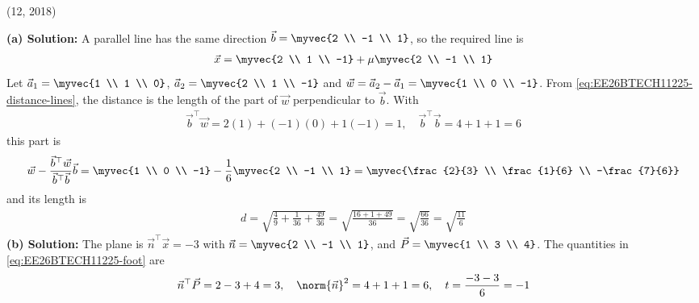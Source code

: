 \begin{enumerate}[label=\thesubsection.\arabic*, ref=\thesubsection.\theenumi]
\par\hfill (12, 2018)\par
\textbf{(a) Solution:} A parallel line has the same direction $\vec{b} = \myvec{2 \\ -1 \\ 1}$, so the required line is
\begin{align}
\vec{x} = \myvec{2 \\ 1 \\ -1} + \mu\myvec{2 \\ -1 \\ 1}
\end{align}
Let $\vec{a}_1 = \myvec{1 \\ 1 \\ 0}$, $\vec{a}_2 = \myvec{2 \\ 1 \\ -1}$ and $\vec{w} = \vec{a}_2 - \vec{a}_1 = \myvec{1 \\ 0 \\ -1}$. From \eqref{eq:EE26BTECH11225-distance-lines}, the distance is the length of the part of $\vec{w}$ perpendicular to $\vec{b}$. With
\begin{align*}
\vec{b}^{\top}\vec{w} = 2(1) + (-1)(0) + 1(-1) = 1, \quad \vec{b}^{\top}\vec{b} = 4 + 1 + 1 = 6
\end{align*}
this part is
\begin{align*}
\vec{w} - \frac{\vec{b}^{\top}\vec{w}}{\vec{b}^{\top}\vec{b}}\vec{b} = \myvec{1 \\ 0 \\ -1} - \frac{1}{6}\myvec{2 \\ -1 \\ 1} = \myvec{\frac{2}{3} \\ \frac{1}{6} \\ -\frac{7}{6}}
\end{align*}
and its length is
\begin{align}
d = \sqrt{\frac{4}{9} + \frac{1}{36} + \frac{49}{36}} = \sqrt{\frac{16 + 1 + 49}{36}} = \sqrt{\frac{66}{36}} = \boxed{\sqrt{\frac{11}{6}}}
\end{align}
\textbf{(b) Solution:} The plane is $\vec{n}^{\top}\vec{x} = -3$ with $\vec{n} = \myvec{2 \\ -1 \\ 1}$, and $\vec{P} = \myvec{1 \\ 3 \\ 4}$. The quantities in \eqref{eq:EE26BTECH11225-foot} are
\begin{align*}
\vec{n}^{\top}\vec{P} = 2 - 3 + 4 = 3, \quad \norm{\vec{n}}^2 = 4 + 1 + 1 = 6, \quad t = \frac{-3 - 3}{6} = -1

\end{align*}
\end{enumerate}
